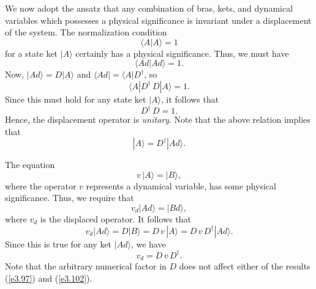 We now adopt the ansatz that any combination of bras, kets, and dynamical
variables which possesses a physical significance is invariant under a displacement
of the system. The normalization condition 
\begin{equation}
\langle A|A\rangle = 1
\end{equation}
for a state ket $|A\rangle$ certainly has a physical significance. Thus, we must
have 
\begin{equation}
\langle Ad|Ad\rangle = 1.
\end{equation}
Now, $|Ad\rangle = D|A\rangle$ and $\langle Ad| = \langle A|D^{\dag}$, so
\begin{equation}
\langle A| D^{\dag} \,D|A\rangle = 1.
\end{equation}
Since this must hold for any state ket $|A\rangle$, it follows that
\begin{equation}\label{e3.97}
D^{\dag} \,D = 1.
\end{equation}
Hence, the displacement operator is {\em unitary}. 
Note that the above relation implies that
\begin{equation}
|A\rangle = D^{\dag} |A d\rangle.
\end{equation}

The  equation
\begin{equation}
v \,|A\rangle = |B\rangle,
\end{equation}
where the operator
$v$ represents a dynamical variable, has some physical significance. Thus,
we require that
\begin{equation}
v_d |Ad\rangle = |Bd\rangle,
\end{equation}
where $v_d$ is the displaced operator. It follows that
\begin{equation}
v_d |Ad\rangle = D |B\rangle = D \,v \,|A\rangle = D\, v\, D^{\dag} |Ad\rangle.
\end{equation}
Since this is true for any ket $|Ad\rangle$, we have
\begin{equation}\label{e3.102}
v_d = D\, v\, D^{\dag}.
\end{equation}
Note that the arbitrary numerical factor in $D$ does not affect either of the
results (\ref{e3.97}) and (\ref{e3.102}).


